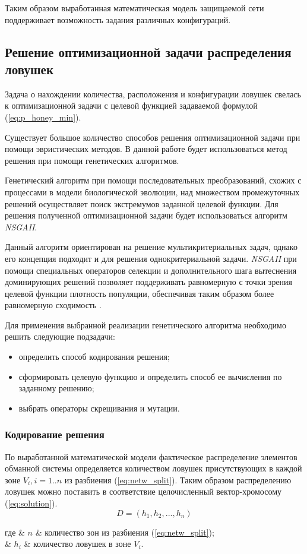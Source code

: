 Таким образом выработанная математическая модель защищаемой сети поддерживает возможность задания различных конфигураций.

\subsection{Решение оптимизационной задачи распределения ловушек}

Задача о нахождении количества, расположения и конфигурации ловушек свелась к оптимизационной задачи с целевой функцией задаваемой формулой (\ref{eq:p_honey_min}).

Существует большое количество способов решения оптимизационной задачи при помощи эвристических методов. В данной работе будет использоваться метод решения при помощи генетических алгоритмов.

Генетический алгоритм при помощи последовательных преобразований, схожих с процессами в модели биологической эволюции, над множеством промежуточных решений осуществляет поиск экстремумов заданной целевой функции. Для решения полученной оптимизационной задачи будет использоваться алгоритм \textit{NSGAII}. 

Данный алгоритм ориентирован на решение мультикритериальных задач, однако его концепция подходит и для решения однокритериальной задачи. \textit{NSGAII} при помощи специальных операторов селекции и дополнительного шага вытеснения доминирующих решений позволяет поддерживать равномерную с точки зрения целевой функции плотность популяции, обеспечивая таким образом более равномерную сходимость \citep{NSGA2002}.

Для применения выбранной реализации генетического алгоритма необходимо решить следующие подзадачи:
\begin{itemize}
	\item определить способ кодирования решения;
	\item сформировать целевую функцию и определить способ ее вычисления по заданному решению;
	\item выбрать операторы скрещивания и мутации.
\end{itemize}

\subsubsection{Кодирование решения}\hspace*{\fill}

По выработанной математической модели фактическое распределение элементов обманной системы определяется количеством ловушек присутствующих в каждой зоне $V_i, i=1..n$ из разбиения (\ref{eq:netw_split}). Таким образом распределению ловушек можно поставить в соответствие целочисленный вектор-хромосому (\ref{eq:solution}).
\begin{equation}
\label{eq:solution}
D = (h_1,h_2,...,h_n) 
\end{equation}
\begin{explanation}
где & $n$ & количество зон из разбиения (\ref{eq:netw_split});\\
	& $h_i$ & количество ловушек в зоне $V_i$.
\end{explanation}


